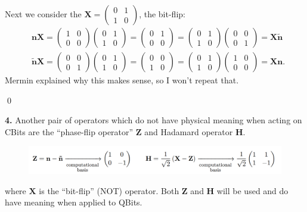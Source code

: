 \documentclass{book}
\theoremstyle{definition}
\newcommand{\X}{\mathbf{X}}
\newcommand{\had}{\mathbf{H}}
\begin{document}
\begin{enumerate}[(a)]
	Next we consider the $\X = \begin{pmatrix}
	0&1\\1&0
	\end{pmatrix}$, the bit-flip:
	\begin{align}
	&\mathbf{n}\X = \begin{pmatrix}
	1&0\\0&0
	\end{pmatrix}\begin{pmatrix}
	0&1\\1&0
	\end{pmatrix}= \begin{pmatrix}
	0&1\\0&0
	\end{pmatrix}=\begin{pmatrix}
	0&1\\1&0
	\end{pmatrix}\begin{pmatrix}
	0&0\\0&1
	\end{pmatrix} = \mathbf{X}\tilde{\mathbf{n}}\\
	&\tilde{\mathbf{n}}\X = \begin{pmatrix}
	0&0\\0&1
	\end{pmatrix}\begin{pmatrix}
	0&1\\1&0
	\end{pmatrix}= \begin{pmatrix}
	0&0\\1&0
	\end{pmatrix}=\begin{pmatrix}
	0&1\\1&0
	\end{pmatrix}\begin{pmatrix}
	1&0\\0&0
	\end{pmatrix} = \mathbf{X}{\mathbf{n}}.
	\end{align}
	Mermin explained why this makes sense, so I won't repeat that.
	
	
\end{enumerate}

\qed













\newpage
\noindent \textbf{4.} Another pair of operators which do not have physical meaning when acting on CBits are the
``phase-flip operator'' $\mathbf{Z}$ and Hadamard operator $\had$. 
\begin{figure}[!htb]
	\centering
	\includegraphics[scale=0.26]{ZH}
\end{figure}
where $\X$ is the ``bit-flip'' (NOT) operator. Both $\mathbf{Z}$ and $\had$ will be used and do have meaning when applied to QBits.
\end{document}
